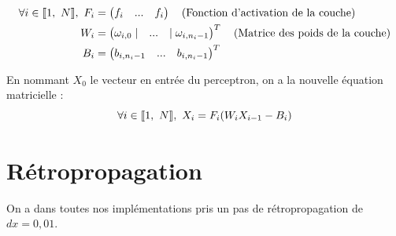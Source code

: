 \begin{align*}
\forall i \in \llbracket 1,\ N \rrbracket,\ F_i &= \begin{pmatrix} f_i & ... & f_i \end{pmatrix}\quad \text{(Fonction d'activation de la couche)}\\
                            W_i &= \begin{pmatrix} \omega_{i,0} \mid & ... & \mid \omega_{i, n_i-1}\end{pmatrix}^T \quad \text{(Matrice des poids de la couche)} \\
                            B_i &= \begin{pmatrix} b_{i, n_i-1} & ... & b_{i, n_i-1}\end{pmatrix}^T 
\end{align*}

En nommant $X_0$ le vecteur en entrée du perceptron, on a la nouvelle équation matricielle : 
\begin{equation}
  \forall i \in \brackets{1,\ N},\ X_i = F_i(W_i X_{i-1} - B_i) 
  \label{equation_propagation_matricielle}
\end{equation}

\section{Rétropropagation}
On a dans toutes nos implémentations pris un pas de rétropropagation de $dx=0,01$.
